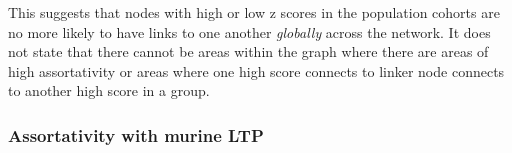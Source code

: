 This suggests that nodes with high or low z scores in the population cohorts are no more likely to have links to one another \textit{globally} across the network. It does not state that there cannot be areas within the graph where there are areas of high assortativity or areas where one high score connects to linker node connects to another high score in a group.

\subsubsection{Assortativity with murine LTP}




